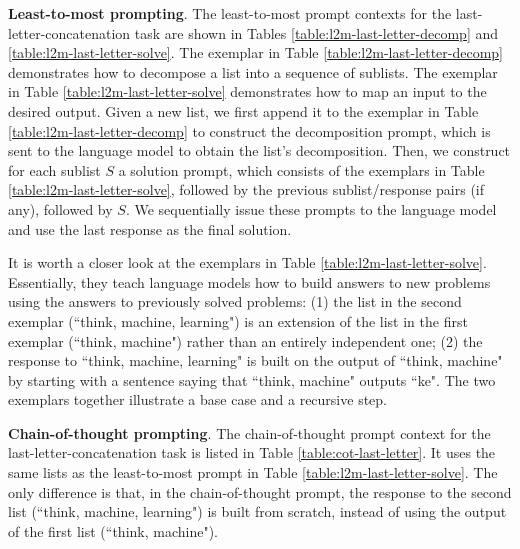 \documentclass{article}
\begin{document}
\textbf{Least-to-most prompting}. The least-to-most prompt contexts for the last-letter-concatenation task are shown in Tables \ref{table:l2m-last-letter-decomp} and \ref{table:l2m-last-letter-solve}. The exemplar in Table \ref{table:l2m-last-letter-decomp} demonstrates how to decompose a list into a sequence of sublists. The exemplar in Table \ref{table:l2m-last-letter-solve} demonstrates how to map an input to the desired output. Given a new list, we first append it to the exemplar in Table \ref{table:l2m-last-letter-decomp} to construct the decomposition prompt, which is sent to the language model to obtain the list's decomposition. Then, we construct for each sublist $S$ a solution prompt, which consists of the exemplars in Table \ref{table:l2m-last-letter-solve}, followed by the previous sublist/response pairs (if any), followed by $S$. We sequentially issue these prompts to the language model and use the last response as the final solution.



It is worth a closer look at the exemplars in Table \ref{table:l2m-last-letter-solve}. Essentially, they teach language models how to build answers to new problems using the answers to previously solved problems:  (1) the list in the second exemplar (``think, machine, learning") is an extension of the list in the first exemplar (``think, machine") rather than an entirely independent one; (2) the response to ``think, machine, learning" is built on the output of ``think, machine" by starting with a sentence saying that ``think, machine" outputs ``ke". The two exemplars together illustrate a base case and a recursive step.






\textbf{Chain-of-thought prompting}.
The chain-of-thought prompt context for the last-letter-concatenation task is listed in Table \ref{table:cot-last-letter}. It uses the same lists as the least-to-most prompt in Table \ref{table:l2m-last-letter-solve}. The only difference is that, in the chain-of-thought prompt, the response to the second list (``think, machine, learning") is built from scratch, instead of using the output of the first list (``think, machine"). 
\end{document}
